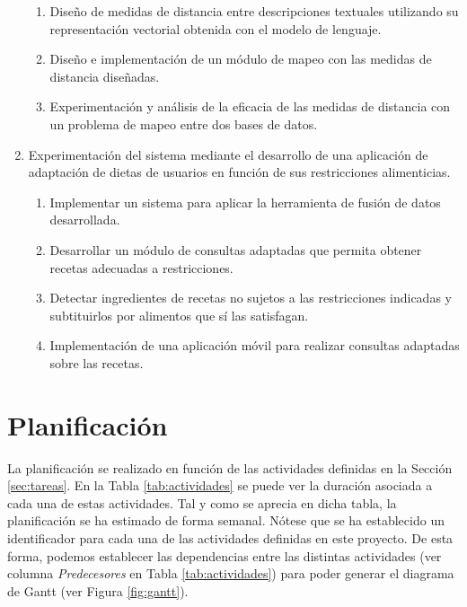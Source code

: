 \begin{enumerate}
\begin{enumerate}
            \item Diseño de medidas de distancia entre descripciones textuales utilizando su representación vectorial obtenida con el modelo de lenguaje.
            
            \item Diseño e implementación de un módulo de mapeo con las medidas de distancia diseñadas.
            
            \item Experimentación y análisis de la eficacia de las medidas de distancia con un problema de mapeo entre dos bases de datos.
            
        \end{enumerate}
            

    \item Experimentación del sistema mediante el desarrollo de una aplicación de adaptación de dietas de usuarios en función de sus restricciones alimenticias.
    
    \begin{enumerate}
        \item Implementar un sistema para aplicar la herramienta de fusión de datos desarrollada.
        
        \item Desarrollar un módulo de consultas adaptadas que permita obtener recetas adecuadas a restricciones.
        
        \item Detectar ingredientes de recetas no sujetos a las restricciones indicadas y subtituirlos por alimentos que sí las satisfagan. 


        \item Implementación de una aplicación móvil para realizar consultas adaptadas sobre las recetas. 


    \end{enumerate}
    
\end{enumerate}

\section{Planificación}

La planificación se realizado en función de las actividades definidas en la Sección \ref{sec:tareas}. En la Tabla \ref{tab:actividades} se puede ver la duración asociada a cada una de estas actividades. Tal y como se aprecia en dicha tabla, la planificación se ha estimado de forma semanal. Nótese que se ha establecido un identificador para cada una de las actividades definidas en este proyecto. De esta forma, podemos establecer las dependencias entre las distintas actividades (ver columna \textit{Predecesores} en Tabla \ref{tab:actividades}) para poder generar el diagrama de Gantt (ver Figura \ref{fig:gantt}).

